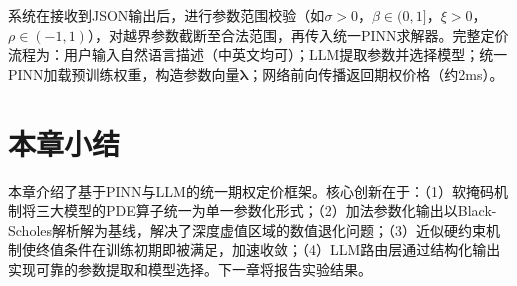 系统在接收到JSON输出后，进行参数范围校验（如$\sigma>0$，$\beta\in(0,1]$，$\xi>0$，$\rho\in(-1,1)$），对越界参数截断至合法范围，再传入统一PINN求解器。完整定价流程为：用户输入自然语言描述（中英文均可）；LLM提取参数并选择模型；统一PINN加载预训练权重，构造参数向量$\boldsymbol{\lambda}$；网络前向传播返回期权价格（约2ms）。

\section{本章小结}\label{sec:method_summary}

本章介绍了基于PINN与LLM的统一期权定价框架。核心创新在于：（1）软掩码机制将三大模型的PDE算子统一为单一参数化形式；（2）加法参数化输出以Black-Scholes解析解为基线，解决了深度虚值区域的数值退化问题；（3）近似硬约束机制使终值条件在训练初期即被满足，加速收敛；（4）LLM路由层通过结构化输出实现可靠的参数提取和模型选择。下一章将报告实验结果。
